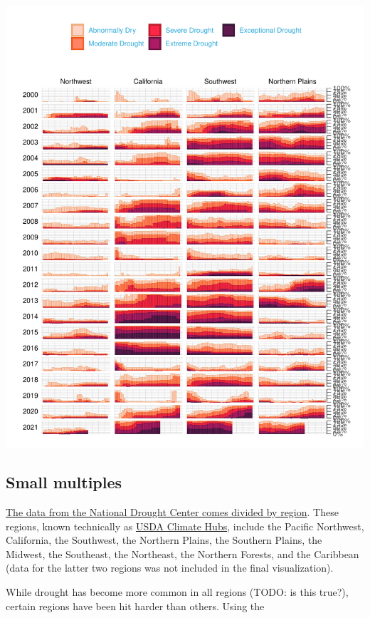 \documentclass[
]{book}
\begin{document}
\includegraphics{data-viz_files/figure-latex/unnamed-chunk-4-1.pdf}

\hypertarget{small-multiples}{%
\subsection{Small multiples}\label{small-multiples}}

\href{https://droughtmonitor.unl.edu/DmData/DataDownload/ComprehensiveStatistics.aspx}{The data from the National Drought Center comes divided by region}. These regions, known technically as \href{https://www.climatehubs.usda.gov/}{USDA Climate Hubs}, include the Pacific Northwest, California, the Southwest, the Northern Plains, the Southern Plains, the Midwest, the Southeast, the Northeast, the Northern Forests, and the Caribbean (data for the latter two regions was not included in the final visualization).

While drought has become more common in all regions (TODO: is this true?), certain regions have been hit harder than others. Using the
\end{document}
